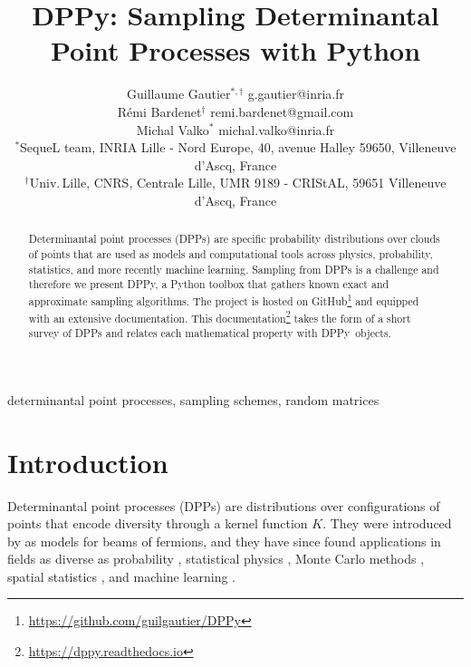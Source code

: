 \documentclass[twoside,11pt]{article}
\newcommand{\DPPy}{\textsf{DPPy}}
\begin{document}
\title{\DPPy: Sampling Determinantal Point Processes with Python}

\author{\name Guillaume Gautier$^{*,\dagger}$ \email g.gautier@inria.fr \\
       \name R\'emi Bardenet$^\dagger$ \email remi.bardenet@gmail.com \\
       \name Michal Valko$^*$ \email michal.valko@inria.fr\\
       \addr $^*$SequeL team, INRIA Lille - Nord Europe,  40, avenue Halley 59650, Villeneuve d'Ascq, France\\
       \addr $^\dagger$Univ.\,Lille, CNRS, Centrale Lille, UMR 9189 - CRIStAL, 59651 Villeneuve d'Ascq, France
}

\editor{}

\maketitle

\setcounter{footnote}{3}
\begin{abstract}%
  Determinantal point processes (DPPs) are specific probability distributions over clouds of points that are used as models and computational tools across physics, probability, statistics, and more recently machine learning.
  Sampling from DPPs is a challenge and therefore we present \DPPy, a Python toolbox that gathers known exact and approximate sampling algorithms.
  The project is hosted on GitHub\footnote{\label{fn:github}\url{https://github.com/guilgautier/DPPy}} and equipped with an extensive documentation.
  This documentation\footnote{\label{fn:docs}\url{https://dppy.readthedocs.io}} takes the form of a short survey of DPPs and relates each mathematical property with \DPPy\ objects.
\end{abstract}

\begin{keywords}%
  determinantal point processes,
  sampling schemes,
  random matrices
\end{keywords}

\section{Introduction} %
\label{sec:introduction}

Determinantal point processes (DPPs) are distributions over configurations of points that encode diversity through a kernel function $K$.
They were introduced by \citet{Mac75} as models for beams of fermions, and they have since found applications in fields as diverse as probability \citep{Sos00, Kon05, HKPV06}, statistical physics \citep{PaBe11}, Monte Carlo methods \citep{BaHa16}, spatial statistics \citep{LaMoRu15}, and machine learning \citep[ML,][]{KuTa12}.
\end{document}
